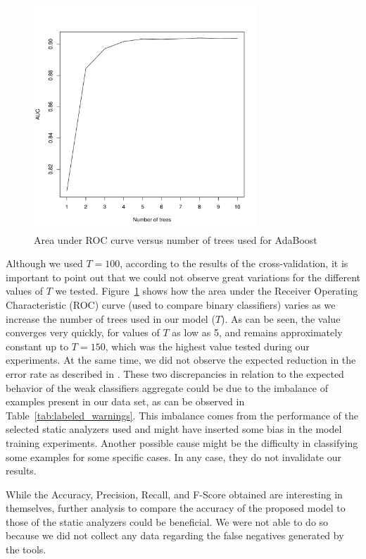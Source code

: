 \begin{figure}
\centering
\includegraphics[width=0.75\textwidth]{figures/roc.pdf}
  \caption{Area under ROC curve versus number of trees used for AdaBoost}\label{fig:roc}
\end{figure}


Although we used $T=100$, according to the results of the cross-validation, it is
important to point out that we could not observe great variations for the
different values of $T$ we tested. Figure~\ref{fig:roc} shows how the area
under the Receiver Operating Characteristic (ROC) curve (used to compare binary
classifiers) varies as we increase the number of trees used in our model ($T$).
As can be seen, the value converges very quickly, for values of $T$ as low as 5, and remains
approximately constant up to $T = 150$, which was the highest value tested
during our experiments. At the same time, we did not observe the expected
reduction in the error rate as described in \cite{freund1999short}.
These two discrepancies in relation to the expected behavior of the weak classifiers aggregate 
could be due to the imbalance of examples present
in our data set, as can be observed in Table~\ref{tab:labeled_warnings}. This
imbalance comes from the performance of the selected static analyzers used and
might have inserted some bias in the model training experiments. Another possible
cause might be
the difficulty in classifying some examples for some specific cases. In
any case, they do not invalidate our results.

While the Accuracy, Precision, Recall, and F-Score obtained are interesting
in themselves, 
further analysis to compare the accuracy of the proposed
model to those of the static analyzers could be beneficial. We were not
able to do so because we did not collect any data
regarding the false negatives generated by the tools.

